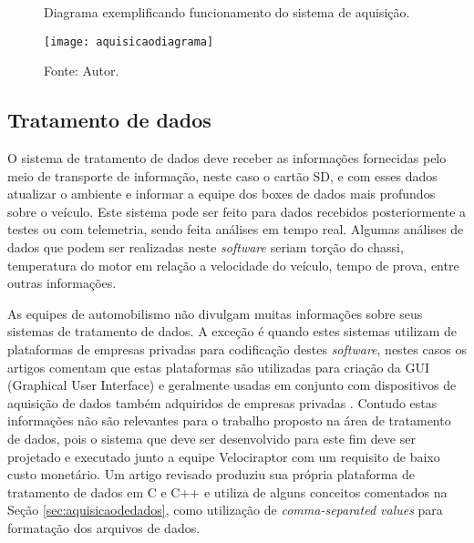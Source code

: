 \begin{figure}[!htb]
	\centering
		\caption{Diagrama exemplificando funcionamento do sistema de aquisição.}
		\texttt{[image: aquisicaodiagrama]} 
		\caption*{Fonte: Autor.}
		\label{fig:aquisicaodiagrama}
\end{figure} 


\subsection{Tratamento de dados}

O sistema de tratamento de dados deve receber as informações fornecidas pelo meio de transporte de informação, neste caso o cartão SD, e com esses dados atualizar o ambiente e informar a equipe dos boxes de dados mais profundos sobre o veículo. Este sistema pode ser feito para dados recebidos posteriormente a testes ou com telemetria, sendo feita análises em tempo real. Algumas análises de dados que podem ser realizadas neste \textit{software} seriam torção do chassi, temperatura do motor em relação a velocidade do veículo, tempo de prova, entre outras informações. 

As equipes de automobilismo não divulgam muitas informações sobre seus sistemas de tratamento de dados. A exceção é quando estes sistemas utilizam de plataformas de empresas privadas para codificação destes \textit{software}, nestes casos os artigos comentam que estas plataformas são utilizadas para criação da GUI (Graphical User Interface) e geralmente usadas em conjunto com dispositivos de aquisição de dados também adquiridos de empresas privadas \cite{applicationOfData2010}\cite{vehicleDataAcquisition2014}\cite{designAndImplementation2015}\cite{developmentOfAn2016}. Contudo estas informações não são relevantes para o trabalho proposto na área de tratamento de dados, pois o sistema que deve ser desenvolvido para este fim deve ser projetado e executado junto a equipe Velociraptor com um requisito de baixo custo monetário. Um artigo revisado produziu sua própria plataforma de tratamento de dados em C e C++ \cite{racecarInstrumentationFor2012} e utiliza de alguns conceitos comentados na Seção \ref{sec:aquisicaodedados}, como utilização de \textit{comma-separated values} para formatação dos arquivos de dados. 

